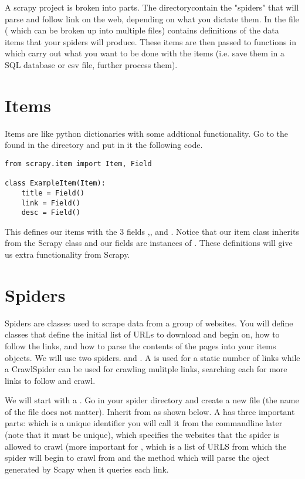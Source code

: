 A scrapy project is broken into parts. The  directorycontain the "spiders" that will parse and follow link on the web, depending on what you dictate them. In the  file ( which can be broken up into multiple files) contains definitions of the data items that your spiders will produce. These items are then passed to functions in  which carry out what you want to be done with the items (i.e. save them in a SQL database or csv file, further process them).

\section*{Items}
Items are like python dictionaries with some addtional functionality. Go to the  found in the  directory
and put in it the following code.
\begin{lstlisting}
from scrapy.item import Item, Field

class ExampleItem(Item):
    title = Field()
    link = Field()
    desc = Field()
\end{lstlisting}

This defines our items with the 3 fields ,, and . Notice that our item class inherits from the Scrapy class  and our fields are instances of . These definitions will give us extra functionality from Scrapy.

\section*{Spiders}
Spiders are classes used to scrape data from a group of websites. You will define classes that define the initial list of URLs to download and begin on, how to follow the links, and how to parse the contents of the pages into your items objects. We will use two spiders.  and . A  is used for a static number of links while a CrawlSpider can be used for crawling mulitple links, searching each for more links to follow and crawl.

We will start with a . Go in your spider directory and create a new file (the name of the file does not matter). Inherit from  as shown below. A  has three important parts:  which is a unique identifier you will call it from the commandline later (note that it must be unique),  which specifies the websites that the spider is allowed to crawl (more important for ,  which is a list of URLS from which the spider will begin to crawl from and the method  which will parse the  oject generated by Scapy when it queries each link.

